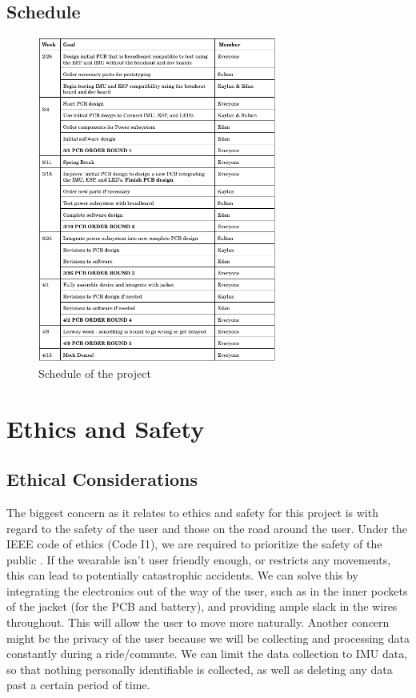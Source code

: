 \documentclass[12pt]{article}
\begin{document}
\newpage
\subsection{Schedule}
\begin{figure}[ht]
    \centering
    \includegraphics[width=0.70\textwidth]{schedule.png}
    \caption{Schedule of the project}
    \label{fig:my_label3}
\end{figure}
\section{Ethics and Safety}
\subsection{Ethical Considerations}
The biggest concern as it relates to ethics and safety for 
this project is with regard to the safety of the user and 
those on the road around the user. Under the IEEE code of 
ethics (Code I1), we are required to prioritize the 
safety of the public \cite{IEEEethics2024}. If the wearable isn’t user
friendly enough, or restricts any movements, this can lead 
to potentially catastrophic accidents. We can solve this by 
integrating the electronics out of the way of the user, 
such as in the inner pockets of the jacket (for the PCB 
and battery), and providing ample slack in the wires 
throughout. This will allow the user to move more naturally.
Another concern might be the privacy of the user \cite{IEEEethics2024}
because we will be collecting and processing data constantly 
during a ride/commute. We can limit the data collection to 
IMU data, so that nothing personally identifiable is
collected, as well as deleting any data past a certain 
period of time. 
\end{document}
